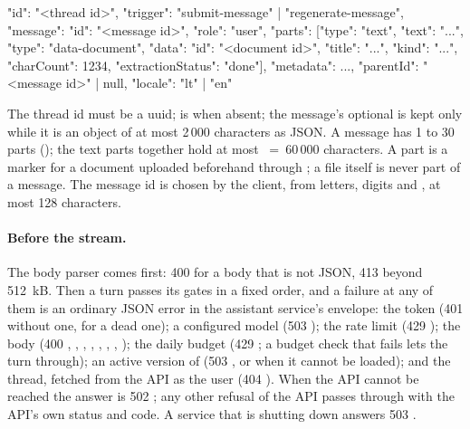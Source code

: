 \begin{codeblock}
{"id": "<thread id>",
 "trigger": "submit-message" | "regenerate-message",
 "message": {"id": "<message id>", "role": "user",
             "parts": [{"type": "text", "text": "..."},
                       {"type": "data-document", "data": {"id": "<document id>", "title": "...",
                        "kind": "...", "charCount": 1234, "extractionStatus": "done"}}],
             "metadata": {...}},
 "parentId": "<message id>" | null,
 "locale": "lt" | "en"}
\end{codeblock}

The thread id must be a uuid;  is  when absent; the
message's optional  is kept only while it is an object of at most 2\,000
characters as JSON. A message has 1 to 30 parts (); the text parts together hold at most
~=~60\,000 characters. A  part is a marker for a
document uploaded beforehand through ; a file itself is never part
of a message. The message id is chosen by the client, from letters, digits and
, at most 128 characters.

\paragraph{Before the stream.} The body parser comes first: 400  for a
body that is not JSON, 413  beyond 512~kB. Then a turn passes its
gates in a fixed order, and a failure at any of them is an ordinary JSON error in the
assistant service's envelope: the token (401  without one,
 for a dead one); a configured model (503 ); the
rate limit (429 ); the body (400 , ,
, , , ,
, ); the daily budget (429 ;
a budget check that fails lets the turn through); an active version of  (503
, or  when it cannot be loaded); and the
thread, fetched from the API as the user (404 ). When the API cannot be
reached the answer is 502 ; any other refusal of the API passes
through with the API's own status and code. A service that is shutting down answers 503
.

